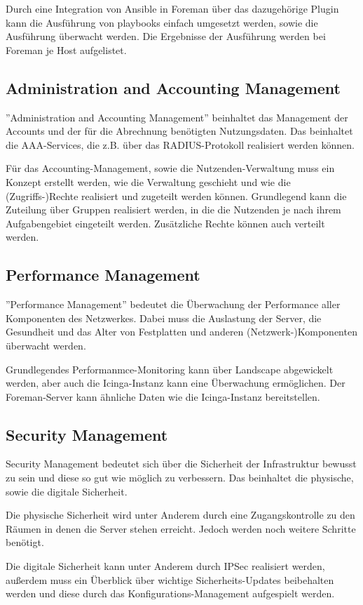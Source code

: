 Durch eine Integration von Ansible in Foreman über das dazugehörige Plugin kann die Ausführung von playbooks einfach umgesetzt werden, sowie die Ausführung überwacht werden. Die Ergebnisse der Ausführung werden bei Foreman je Host aufgelistet.

\subsection{Administration and Accounting Management}
''Administration and Accounting Management'' beinhaltet das Management der Accounts und der für die Abrechnung benötigten Nutzungsdaten. Das beinhaltet die AAA-Services, die z.B. über das RADIUS-Protokoll realisiert werden können. 

Für das Accounting-Management, sowie die Nutzenden-Verwaltung muss ein Konzept erstellt werden, wie die Verwaltung geschieht und wie die (Zugriffs-)Rechte realisiert und zugeteilt werden können. Grundlegend kann die Zuteilung über Gruppen realisiert werden, in die die Nutzenden je nach ihrem Aufgabengebiet eingeteilt werden. Zusätzliche Rechte können auch verteilt werden.

\subsection{Performance Management}
''Performance Management'' bedeutet die Überwachung der Performance aller Komponenten des Netzwerkes. Dabei muss die Auslastung der Server, die Gesundheit und das Alter von Festplatten und anderen (Netzwerk-)Komponenten überwacht werden.

Grundlegendes Performanmce-Monitoring kann über Landscape abgewickelt werden, aber auch die Icinga-Instanz kann eine Überwachung ermöglichen. 
Der Foreman-Server kann ähnliche Daten wie die Icinga-Instanz bereitstellen.


\subsection{Security Management}
Security Management bedeutet sich über die Sicherheit der Infrastruktur bewusst zu sein und diese so gut wie möglich zu verbessern. Das beinhaltet die physische, sowie die digitale Sicherheit.

Die physische Sicherheit wird unter Anderem durch eine Zugangskontrolle zu den Räumen in denen die Server stehen erreicht. Jedoch werden noch weitere Schritte benötigt.

Die digitale Sicherheit kann unter Anderem durch IPSec realisiert werden, außerdem muss ein Überblick über wichtige Sicherheits-Updates beibehalten werden und diese durch das Konfigurations-Management aufgespielt werden.

